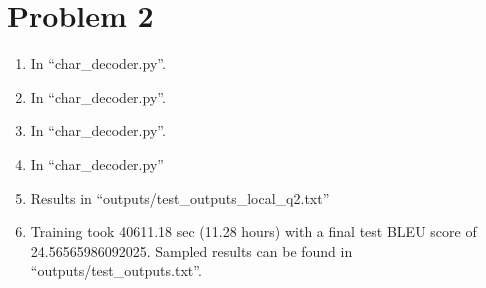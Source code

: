 \documentclass[12pt]{article}
\begin{document}
\section*{Problem 2}
\begin{enumerate}[label=(\alpha*)]
  \item In ``char\_decoder.py''.
  \item In ``char\_decoder.py''.
  \item In ``char\_decoder.py''.
  \item In ``char\_decoder.py''
  \item Results in ``outputs/test\_outputs\_local\_q2.txt''
  \item Training took 40611.18 sec (11.28 hours) with a final test BLEU score of 24.56565986092025. Sampled results can be found in ``outputs/test\_outputs.txt''.
\end{enumerate}
\end{document}
